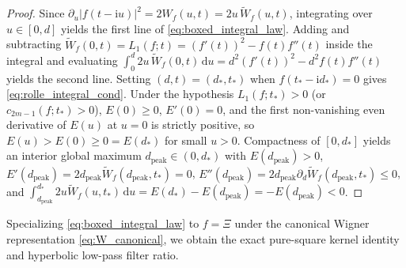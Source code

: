 \documentclass[11pt,a4paper,reqno]{amsart}
\theoremstyle{definition}
\theoremstyle{remark}
\numberwithin{equation}{section}
\newcommand{\dd}{\mathrm{d}}
\newcommand{\ii}{\mathrm{i}}
\newcommand{\Wtil}{\widetilde{W}}
\begin{document}
\begin{proof}
Since $\partial_u|f(t-\ii u)|^2 = 2W_f(u,t) = 2u\,\Wtil_f(u,t)$, integrating over $u \in [0,d]$ yields the first line of \eqref{eq:boxed_integral_law}. Adding and subtracting $\Wtil_f(0,t) = L_1(f;t) = (f'(t))^2 - f(t)f''(t)$ inside the integral and evaluating $\int_0^d 2u\,\Wtil_f(0,t)\,\dd u = d^2(f'(t))^2 - d^2 f(t)f''(t)$ yields the second line. Setting $(d,t) = (d_*,t_*)$ when $f(t_* - \ii d_*) = 0$ gives \eqref{eq:rolle_integral_cond}. Under the hypothesis $L_1(f;t_*) > 0$ (or $c_{2m-1}(f;t_*) > 0$), $E(0) \ge 0$, $E'(0) = 0$, and the first non-vanishing even derivative of $E(u)$ at $u = 0$ is strictly positive, so $E(u) > E(0) \ge 0 = E(d_*)$ for small $u > 0$. Compactness of $[0, d_*]$ yields an interior global maximum $d_{\mathrm{peak}} \in (0, d_*)$ with $E(d_{\mathrm{peak}}) > 0$, $E'(d_{\mathrm{peak}}) = 2d_{\mathrm{peak}}\Wtil_f(d_{\mathrm{peak}}, t_*) = 0$, $E''(d_{\mathrm{peak}}) = 2d_{\mathrm{peak}}\partial_d\Wtil_f(d_{\mathrm{peak}}, t_*) \le 0$, and $\int_{d_{\mathrm{peak}}}^{d_*} 2u\Wtil_f(u,t_*)\,\dd u = E(d_*) - E(d_{\mathrm{peak}}) = -E(d_{\mathrm{peak}}) < 0$.
\end{proof}

Specializing \eqref{eq:boxed_integral_law} to $f = \Xi$ under the canonical Wigner representation \eqref{eq:W_canonical}, we obtain the exact pure-square kernel identity and hyperbolic low-pass filter ratio.
\end{document}
